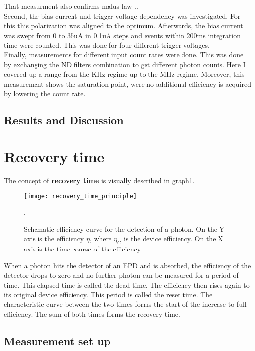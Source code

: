 That measurment also confirms malus law ..\\

Second, the bias current und trigger voltage dependency was investigated.
For this this polarization was aligned to the optimum.
Afterwards, the bias current was swept from 0 to 35uA in 0.1uA steps and events within 200ms integration
time were counted. This was done for four different trigger voltages. \\

Finally, measurements for different input count rates were done.
This was done by exchanging the ND filters combination to get different photon counts.
Here I covered up a range from the KHz regime up to the MHz regime.
Moreover, this measurement shows the saturation point, were no additional efficiency is acquired by lowering the count rate.


\subsection*{Results and Discussion}
\section{Recovery time}

The concept of \textbf{recovery time} is visually described in graph\ref{fig:Recovery_time}. \\
\begin{figure}[hhh]
\texttt{[image: recovery\_time\_principle]}
\caption{Schematic efficiency curve for the detection of a photon\cite{shalm_single-photon_2013}. On the Y axis is the
efficiency $\eta$, where $\eta_{G}$ is the device efficiency. On the X axis is the time course of the efficiency}.
\label{fig:Recovery_time}
\end{figure}

When a photon hits the detector of an EPD and is absorbed, the efficiency of the detector drops to zero and no further
photon can be measured for a period of time.
This elapsed time is called the dead time.
The efficiency then rises again to its original device efficiency.
This period is called the reset time.
The characteristic curve between the two times forms the start of the increase to full efficiency.
The sum of both times forms the recovery time.

\subsection*{Measurement set up}

